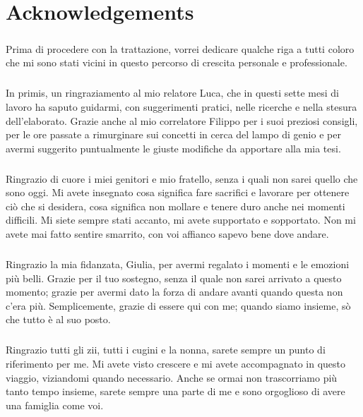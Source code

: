 
\chapter*{Acknowledgements}
\paragraph{}
Prima di procedere con la trattazione, vorrei dedicare qualche riga a tutti coloro che mi sono stati vicini in questo percorso di crescita personale e professionale.

\paragraph{}
In primis, un ringraziamento al mio relatore Luca, che in questi sette mesi di lavoro ha saputo guidarmi, con suggerimenti pratici, nelle ricerche e nella stesura dell’elaborato.
Grazie anche al mio correlatore Filippo per i suoi preziosi consigli, per le ore passate a rimurginare sui concetti in cerca del lampo di genio e per avermi suggerito puntualmente le giuste modifiche da apportare alla mia tesi.

\paragraph{}
Ringrazio di cuore i miei genitori e mio fratello, senza i quali non sarei quello che sono oggi. Mi avete insegnato cosa significa fare sacrifici e lavorare per ottenere ciò che si desidera, cosa significa non mollare e tenere duro anche nei momenti difficili. Mi siete sempre stati accanto, mi avete supportato e sopportato. Non mi avete mai fatto sentire smarrito, con voi affianco sapevo bene dove andare.

\paragraph{}
Ringrazio la mia fidanzata, Giulia, per avermi regalato i momenti e le emozioni più belli. Grazie per il tuo sostegno, senza il quale non sarei arrivato a questo momento; grazie per avermi dato la forza di andare avanti quando questa non c'era più. Semplicemente, grazie di essere qui con me; quando siamo insieme, sò che tutto è al suo posto.

\paragraph{}
Ringrazio tutti gli zii, tutti i cugini e la nonna, sarete sempre un punto di riferimento per me. Mi avete visto crescere e mi avete accompagnato in questo viaggio, viziandomi quando necessario. Anche se ormai non trascorriamo più tanto tempo insieme, sarete sempre una parte di me e sono orgoglioso di avere una famiglia come voi.

